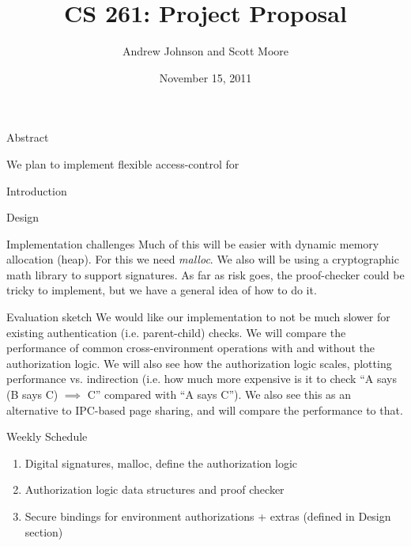 \documentclass[10pt]{article}
\begin{document}
\title{CS 261: Project Proposal}
\author{Andrew Johnson and Scott Moore}
\date{November 15, 2011}

\maketitle

\thispagestyle{empty}

\begin{comment}

\begin{problem}{Problem Title}
Problem Statement
\newline\newline
\textbf{\emph{Solution}}:
\newline\newline
Solution goes here
\end{problem}

\end{comment}

\begin{section}{Abstract}

We plan to implement flexible access-control for 

\end{section}

\begin{section}{Introduction}
\end{section}

\begin{section}{Design}
\end{section}

\begin{section}{Implementation challenges}
Much of this will be easier with dynamic memory allocation (heap).  
For this we need \emph{malloc}.  
We also will be using a cryptographic math library to support signatures. 
As far as risk goes, the proof-checker could be tricky to implement, but we have a general idea of how to do it.
\end{section}

\begin{section}{Evaluation sketch}
We would like our implementation to not be much slower for existing authentication (i.e. parent-child) checks.  
We will compare the performance of common cross-environment operations with and without the authorization logic.  
We will also see how the authorization logic scales, plotting performance vs. indirection (i.e. how much more expensive is it to check ``A says (B says C) $\implies$ C'' compared with ``A says C'').
We also see this as an alternative to IPC-based page sharing, and will compare the performance to that.
\end{section}

\begin{section}{Weekly Schedule}
\begin{enumerate}
\item Digital signatures, malloc, define the authorization logic
\item Authorization logic data structures and proof checker
\item Secure bindings for environment authorizations + extras (defined in Design section)
\end{enumerate}
\end{section}
\end{document}
